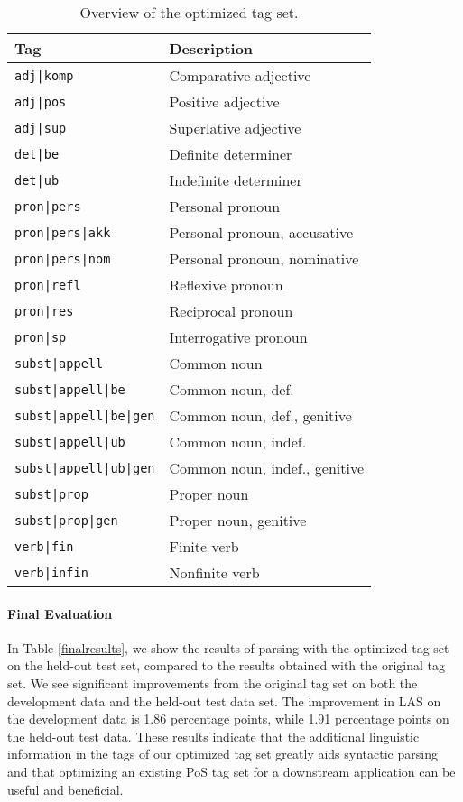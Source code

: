 \documentclass[11pt,a4paper]{article}
\begin{document}
\begin{table}
    \centering
    \smaller[0.5]
    \begin{tabular}{@{}ll@{}}
        \toprule
        \textbf{Tag} & \textbf{Description} \\
        \midrule
        \texttt{adj|komp} & Comparative adjective \\
        \texttt{adj|pos} & Positive adjective \\
        \texttt{adj|sup} & Superlative adjective \\
        \texttt{det|be} & Definite determiner \\
        \texttt{det|ub} & Indefinite determiner \\
        \texttt{pron|pers} & Personal pronoun \\
        \texttt{pron|pers|akk} & Personal pronoun, accusative \\
        \texttt{pron|pers|nom} & Personal pronoun, nominative \\
        \texttt{pron|refl} & Reflexive pronoun \\
        \texttt{pron|res} & Reciprocal pronoun \\
        \texttt{pron|sp} & Interrogative pronoun \\
        \texttt{subst|appell} & Common noun \\
        \texttt{subst|appell|be} & Common noun, def. \\
        \texttt{subst|appell|be|gen} & Common noun, def., genitive \\
        \texttt{subst|appell|ub} & Common noun, indef. \\
        \texttt{subst|appell|ub|gen} & Common noun, indef., genitive \\
        \texttt{subst|prop} & Proper noun \\
        \texttt{subst|prop|gen} & Proper noun, genitive \\
        \texttt{verb|fin} & Finite verb \\
        \texttt{verb|infin} & Nonfinite verb \\
        \bottomrule
    \end{tabular}
    \caption{Overview of the optimized tag set.}
    \label{optimizedtagset}
\end{table}

\paragraph{Final Evaluation}
In Table \ref{finalresults}, we show the results of parsing with the optimized
tag set on the held-out test set, compared to the results obtained with the
original tag set. We see significant improvements from the original tag set on
both the development data and the held-out test data set. The improvement in
LAS on the development data is 1.86 percentage points, while 1.91 percentage
points on the held-out test data. These results indicate that the additional
linguistic information in the tags of our optimized tag set greatly aids
syntactic parsing and that optimizing an existing PoS tag set for a downstream
application can be useful and beneficial.
\end{document}
